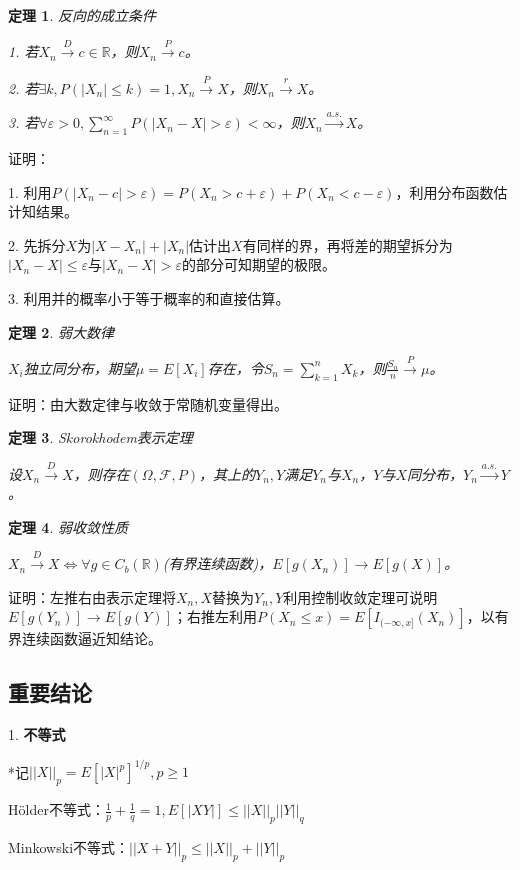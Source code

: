 \documentclass[a4paper,UTF8,fontset=windows]{ctexart}
\newtheorem{thm}{定理}[section]
\newcommand{\con}[1]{\stackrel{#1}{\longrightarrow}}
\begin{document}
\begin{thm} 反向的成立条件

1. 若$X_n\con{D}c\in\mathbb{R}$，则$X_n\con{P}c$。

2. 若$\exists k,P(|X_n|\le k)=1,X_n\con{P}X$，则$X_n\con{r}X$。

3. 若$\forall\varepsilon>0,\sum_{n=1}^\infty P(|X_n-X|>\varepsilon)<\infty$，则$X_n\con{a.s.}X$。
\end{thm}

证明：

1. 利用$P(|X_n-c|>\varepsilon)=P(X_n>c+\varepsilon)+P(X_n<c-\varepsilon)$，利用分布函数估计知结果。

2. 先拆分$X$为$|X-X_n|+|X_n|$估计出$X$有同样的界，再将差的期望拆分为$|X_n-X|\le\varepsilon$与$|X_n-X|>\varepsilon$的部分可知期望的极限。

3. 利用并的概率小于等于概率的和直接估算。

\begin{thm} 弱大数律

$X_i$独立同分布，期望$\mu=E[X_i]$存在，令$S_n=\sum_{k=1}^nX_k$，则$\frac{S_n}{n}\con{P}\mu$。
\end{thm}

证明：由大数定律与收敛于常随机变量得出。

\begin{thm} \emph{Skorokhodem表示定理}

设$X_n\con{D}X$，则存在$(\Omega,\mathcal{F},P)$，其上的$Y_n,Y$满足$Y_n$与$X_n$，$Y$与$X$同分布，$Y_n\con{a.s.}Y$。
\end{thm}

\begin{thm} 弱收敛性质

$X_n\con{D}X\Leftrightarrow\forall g\in C_b(\mathbb{R})$(有界连续函数)，$E[g(X_n)]\con{}E[g(X)]$。
\end{thm}

证明：左推右由表示定理将$X_n,X$替换为$Y_n,Y$利用控制收敛定理可说明$E[g(Y_n)]\con{}E[g(Y)]$；右推左利用$P(X_n\le x)=E[I_{(-\infty,x]}(X_n)]$，以有界连续函数逼近知结论。

\subsection{重要结论}
1. \textbf{不等式}

*记$||X||_p=E[|X|^p]^{1/p},p\ge1$

H\"older不等式：$\frac{1}{p}+\frac{1}{q}=1,E[|XY|]\le||X||_p||Y||_q$

Minkowski不等式：$||X+Y||_p\le||X||_p+||Y||_p$
\end{document}
